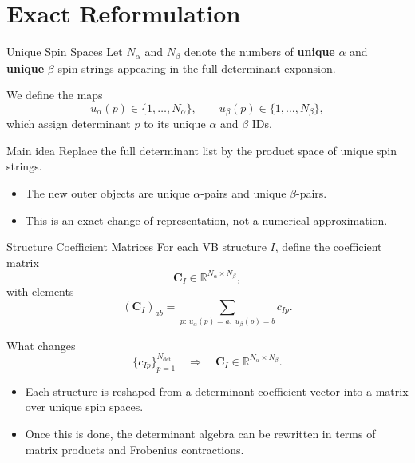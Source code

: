 \documentclass{beamer}
\newcommand{\Dfull}{N_{\mathrm{det}}}
\newcommand{\Na}{N_{\alpha}}
\newcommand{\Nb}{N_{\beta}}
\newcommand{\Cmat}{\mathbf{C}}
\begin{document}
\section{Exact Reformulation}

\begin{frame}{Unique Spin Spaces}
  Let $\Na$ and $\Nb$ denote the numbers of \textbf{unique} $\alpha$ and
  \textbf{unique} $\beta$ spin strings appearing in the full determinant
  expansion.

  We define the maps
  \[
  u_{\alpha}(p)\in \{1,\dots,\Na\},
  \qquad
  u_{\beta}(p)\in \{1,\dots,\Nb\},
  \]
  which assign determinant $p$ to its unique $\alpha$ and $\beta$ IDs.

  \begin{block}{Main idea}
    Replace the full determinant list by the product space of unique spin
    strings.
  \end{block}

  \begin{itemize}
    \item The new outer objects are unique $\alpha$-pairs and unique
          $\beta$-pairs.
    \item This is an exact change of representation, not a numerical
          approximation.
  \end{itemize}
\end{frame}

\begin{frame}{Structure Coefficient Matrices}
  For each VB structure $I$, define the coefficient matrix
  \[
  \Cmat_I \in \mathbb{R}^{\Na \times \Nb},
  \]
  with elements
  \[
  \left(\Cmat_I\right)_{ab}
  =
  \sum_{p:\,u_{\alpha}(p)=a,\;u_{\beta}(p)=b}
  c_{Ip}.
  \]

  \begin{block}{What changes}
    \[
    \{c_{Ip}\}_{p=1}^{\Dfull}
    \quad \Longrightarrow \quad
    \Cmat_I \in \mathbb{R}^{\Na\times\Nb}.
    \]
  \end{block}

  \begin{itemize}
    \item Each structure is reshaped from a determinant coefficient vector into
          a matrix over unique spin spaces.
    \item Once this is done, the determinant algebra can be rewritten in terms
          of matrix products and Frobenius contractions.
  \end{itemize}
\end{frame}
\end{document}
